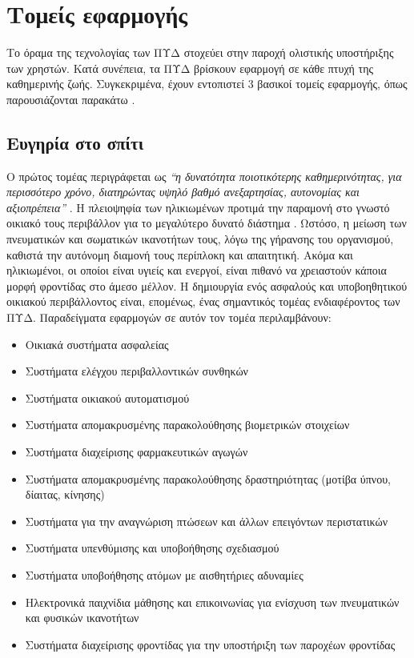 \section{Τομείς εφαρμογής}
Το όραμα της τεχνολογίας των ΠΥΔ στοχεύει στην παροχή ολιστικής υποστήριξης των χρηστών. Κατά συνέπεια, τα ΠΥΔ βρίσκουν εφαρμογή σε κάθε πτυχή της καθημερινής ζωής.
Συγκεκριμένα, έχουν εντοπιστεί 3 βασικοί τομείς εφαρμογής, όπως παρουσιάζονται παρακάτω \cite{broek}.

\subsection{Ευγηρία στο σπίτι}
Ο πρώτος τομέας περιγράφεται ως \textit{``η δυνατότητα ποιοτικότερης καθημερινότητας, για περισσότερο χρόνο, διατηρώντας υψηλό βαθμό ανεξαρτησίας, αυτονομίας και αξιοπρέπεια''} \cite{broek}.
Η πλειοψηφία των ηλικιωμένων προτιμά την παραμονή στο γνωστό οικιακό τους περιβάλλον για το μεγαλύτερο δυνατό διάστημα \cite{Mosca2016}.
Ωστόσο, η μείωση των πνευματικών και σωματικών ικανοτήτων τους, λόγω της γήρανσης του οργανισμού, καθιστά την αυτόνομη διαμονή τους περίπλοκη και απαιτητική.
Ακόμα και ηλικιωμένοι, οι οποίοι είναι υγιείς και ενεργοί, είναι πιθανό να χρειαστούν κάποια μορφή φροντίδας στο άμεσο μέλλον.
Η δημιουργία ενός ασφαλούς και υποβοηθητικού οικιακού περιβάλλοντος είναι, επομένως, ένας σημαντικός τομέας ενδιαφέροντος των ΠΥΔ.
Παραδείγματα εφαρμογών σε αυτόν τον τομέα περιλαμβάνουν:
\begin{itemize}
    \item Οικιακά συστήματα ασφαλείας
    \item Συστήματα ελέγχου περιβαλλοντικών συνθηκών
    \item Συστήματα οικιακού αυτοματισμού
    \item Συστήματα απομακρυσμένης παρακολούθησης βιομετρικών στοιχείων
    \item Συστήματα διαχείρισης φαρμακευτικών αγωγών
    \item Συστήματα απομακρυσμένης παρακολούθησης δραστηριότητας (μοτίβα ύπνου, δίαιτας, κίνησης)
    \item Συστήματα για την αναγνώριση πτώσεων και άλλων επειγόντων περιστατικών
    \item Συστήματα υπενθύμισης και υποβοήθησης σχεδιασμού
    \item Συστήματα υποβοήθησης ατόμων με αισθητήριες αδυναμίες
    \item Ηλεκτρονικά παιχνίδια μάθησης και επικοινωνίας για ενίσχυση των πνευματικών και φυσικών ικανοτήτων
    \item Συστήματα διαχείρισης φροντίδας για την υποστήριξη των παροχέων φροντίδας
\end{itemize}{}

